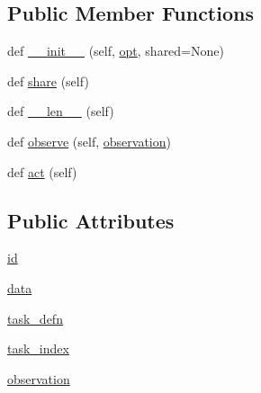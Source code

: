 \subsection*{Public Member Functions}
\begin{DoxyCompactItemize}
\item 
def \hyperlink{classparlai_1_1tasks_1_1taskntalk_1_1agents_1_1TaskNTalkTeacher_aa81863451740657e6bc1a7ba619f178d}{\+\_\+\+\_\+init\+\_\+\+\_\+} (self, \hyperlink{classparlai_1_1core_1_1agents_1_1Teacher_a3ce6243860ce978a897922863ed32fa4}{opt}, shared=None)
\item 
def \hyperlink{classparlai_1_1tasks_1_1taskntalk_1_1agents_1_1TaskNTalkTeacher_aab9351c1b025ee7376cc29e275d38edf}{share} (self)
\item 
def \hyperlink{classparlai_1_1tasks_1_1taskntalk_1_1agents_1_1TaskNTalkTeacher_a620b08d2d0ac05d0941ed79b4c8a708d}{\+\_\+\+\_\+len\+\_\+\+\_\+} (self)
\item 
def \hyperlink{classparlai_1_1tasks_1_1taskntalk_1_1agents_1_1TaskNTalkTeacher_a7c57cabccc60e4d52f2d73667006a3b3}{observe} (self, \hyperlink{classparlai_1_1tasks_1_1taskntalk_1_1agents_1_1TaskNTalkTeacher_a6a60fc70d05b417e7b3ead11d032d976}{observation})
\item 
def \hyperlink{classparlai_1_1tasks_1_1taskntalk_1_1agents_1_1TaskNTalkTeacher_a56446edc110472e01536e12f5c6eac3c}{act} (self)
\end{DoxyCompactItemize}
\subsection*{Public Attributes}
\begin{DoxyCompactItemize}
\item 
\hyperlink{classparlai_1_1tasks_1_1taskntalk_1_1agents_1_1TaskNTalkTeacher_a67ca089abef04a7399904ebe79a1a7e6}{id}
\item 
\hyperlink{classparlai_1_1tasks_1_1taskntalk_1_1agents_1_1TaskNTalkTeacher_ac5d7a2f765aaef625b2ec990298f3886}{data}
\item 
\hyperlink{classparlai_1_1tasks_1_1taskntalk_1_1agents_1_1TaskNTalkTeacher_a1d30c88b02b11387a200b435b568f42a}{task\+\_\+defn}
\item 
\hyperlink{classparlai_1_1tasks_1_1taskntalk_1_1agents_1_1TaskNTalkTeacher_acbb45bff370bad783084168e46522bf5}{task\+\_\+index}
\item 
\hyperlink{classparlai_1_1tasks_1_1taskntalk_1_1agents_1_1TaskNTalkTeacher_a6a60fc70d05b417e7b3ead11d032d976}{observation}
\end{DoxyCompactItemize}


